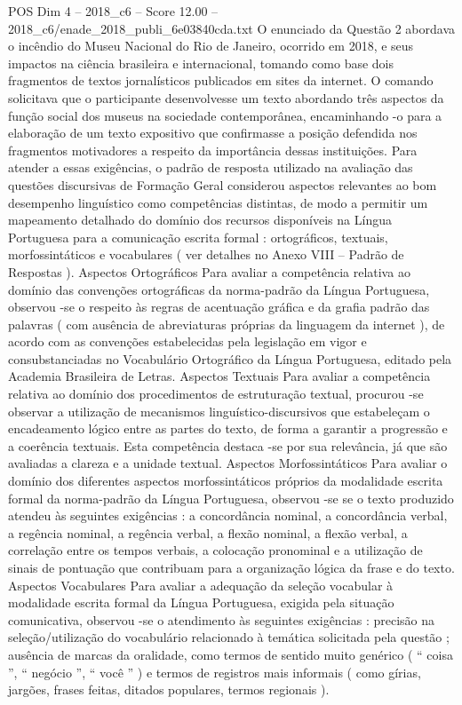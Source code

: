 \begin{textsample}{POS Dim 4 – 2018\_c6 – Score 12.00 – 2018\_c6/enade\_2018\_publi\_6e03840cda.txt}
O enunciado da Questão 2 abordava o incêndio do Museu Nacional do Rio de Janeiro, ocorrido em 2018, e seus impactos na ciência brasileira e internacional, tomando como base dois fragmentos de textos jornalísticos publicados em sites da internet.
O comando solicitava que o participante desenvolvesse um texto abordando três aspectos da função social dos museus na sociedade contemporânea, encaminhando -o para a elaboração de um texto expositivo que confirmasse a posição defendida nos fragmentos motivadores a respeito da importância dessas instituições.
Para atender a essas exigências, o padrão de resposta utilizado na avaliação das questões discursivas de Formação Geral considerou aspectos relevantes ao bom desempenho linguístico como competências distintas, de modo a permitir um mapeamento detalhado do domínio dos recursos disponíveis na Língua Portuguesa para a comunicação escrita formal : ortográficos, textuais, morfossintáticos e vocabulares ( ver detalhes no Anexo VIII – Padrão de Respostas ).
Aspectos Ortográficos Para avaliar a competência relativa ao domínio das convenções ortográficas da norma-padrão da Língua Portuguesa, observou -se o respeito às regras de acentuação gráfica e da grafia padrão das palavras ( com ausência de abreviaturas próprias da linguagem da internet ), de acordo com as convenções estabelecidas pela legislação em vigor e consubstanciadas no Vocabulário Ortográfico da Língua Portuguesa, editado pela Academia Brasileira de Letras.
Aspectos Textuais Para avaliar a competência relativa ao domínio dos procedimentos de estruturação textual, procurou -se observar a utilização de mecanismos linguístico-discursivos que estabeleçam o encadeamento lógico entre as partes do texto, de forma a garantir a progressão e a coerência textuais.
Esta competência destaca -se por sua relevância, já que são avaliadas a clareza e a unidade textual.
Aspectos Morfossintáticos Para avaliar o domínio dos diferentes aspectos morfossintáticos próprios da modalidade escrita formal da norma-padrão da Língua Portuguesa, observou -se se o texto produzido atendeu às seguintes exigências : a concordância nominal, a concordância verbal, a regência nominal, a regência verbal, a flexão nominal, a flexão verbal, a correlação entre os tempos verbais, a colocação pronominal e a utilização de sinais de pontuação que contribuam para a organização lógica da frase e do texto.
Aspectos Vocabulares Para avaliar a adequação da seleção vocabular à modalidade escrita formal da Língua Portuguesa, exigida pela situação comunicativa, observou -se o atendimento às seguintes exigências : precisão na seleção/utilização do vocabulário relacionado à temática solicitada pela questão ; ausência de marcas da oralidade, como termos de sentido muito genérico ( “ coisa ”, “ negócio ”, “ você ” ) e termos de registros mais informais ( como gírias, jargões, frases feitas, ditados populares, termos regionais ).

\end{textsample}
